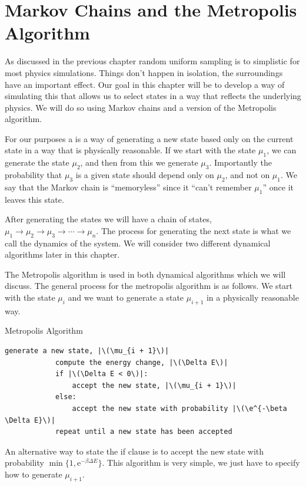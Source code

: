 \documentclass[fleqn]{NotesClass}
\newcommand*{\e}{\mathrm{e}}
\begin{document}
    \section{Markov Chains and the Metropolis Algorithm}
    As discussed in the previous chapter random uniform sampling is to simplistic for most physics simulations.
    Things don't happen in isolation, the surroundings have an important effect.
    Our goal in this chapter will be to develop a way of simulating this that allows us to select states in a way that reflects the underlying physics.
    We will do so using Markov chains and a version of the Metropolis algorithm.
    
    For our purposes a  is a way of generating a new state based only on the current state in a way that is physically reasonable.
    If we start with the state \(\mu_1\), we can generate the state \(\mu_2\), and then from this we generate \(\mu_3\).
    Importantly the probability that \(\mu_3\) is a given state should depend only on \(\mu_2\), and not on \(\mu_1\).
    We say that the Markov chain is \enquote{memoryless} since it \enquote{can't remember \(\mu_1\)} once it leaves this state.
    
    After generating the states we will have a chain of states, \(\mu_1 \to \mu_2 \to \mu_3 \to \dotsb \to \mu_n\).
    The process for generating the next state is what we call the dynamics of the system.
    We will consider two different dynamical algorithms later in this chapter.
    
    The Metropolis algorithm is used in both dynamical algorithms which we will discuss.
    The general process for the metropolis algorithm is as follows.
    We start with the state \(\mu_i\) and we want to generate a state \(\mu_{i+1}\) in a physically reasonable way.
    \begin{cde}{Metropolis Algorithm}{}
        \begin{lstlisting}[gobble=12, escapechar=|]
            generate a new state, |\(\mu_{i + 1}\)|
            compute the energy change, |\(\Delta E\)|
            if |\(\Delta E < 0\)|:
                accept the new state, |\(\mu_{i + 1}\)|
            else:
                accept the new state with probability |\(\e^{-\beta \Delta E}\)|
            repeat until a new state has been accepted
        \end{lstlisting}
    \end{cde}
    An alternative way to state the if clause is to accept the new state with probability \(\min\{1, \e^{-\beta\Delta E}\}\).
    This algorithm is very simple, we just have to specify how to generate \(\mu_{i+1}\).
    
\end{document}
